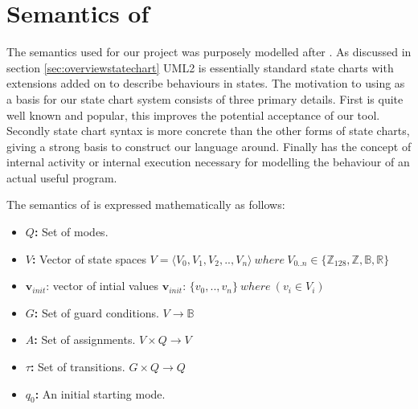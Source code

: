 \section{Semantics of \plcchart}
\label{sec:statechartsem}

The semantics used for our project was purposely modelled after \cite{UML2}. As discussed in section \ref{sec:overviewstatechart} UML2 is essentially standard state charts with extensions added on to describe behaviours in states. The motivation to using \cite{UML2} as a basis for our state chart system consists of three primary details. First \cite{UML2} is quite well known and popular, this improves the potential acceptance of our tool. Secondly \cite{UML2} state chart syntax is more concrete than the other forms of state charts, giving a strong basis to construct our language around. Finally \cite{UML2} has the concept of internal activity or internal execution necessary for modelling the behaviour of an actual useful program.

The semantics of \plcchart is expressed mathematically as follows:

\begin{definition}
	\plcchart
	
\begin{itemize}
	\item \textbf{$Q$:} Set of modes.
	\item \textbf{$V$:} Vector of state spaces $V = \langle V_0,V_1,V_2,..,V_n \rangle \: where \: V_{0..n}\in \lbrace \mathbb{Z}_{128}, \mathbb{Z}, \mathbb{B}, \mathbb{R} \rbrace$
	\item $\mathbf{v}_{init}$: vector of intial values $\mathbf{v}_{init}$: $\lbrace v_0,..,v_n \rbrace \: where \: (v_i \in V_i)$
	\item \textbf{$G$:} Set of guard conditions. $V \rightarrow \mathbb{B}$
	\item \textbf{$A$:} Set of assignments. $V \times Q \rightarrow V$
	\item \textbf{$\tau$:} Set of transitions. $G \times Q \rightarrow Q$
	\item \textbf{$q_0$:} An initial starting mode.
\end{itemize}
\end{definition}

